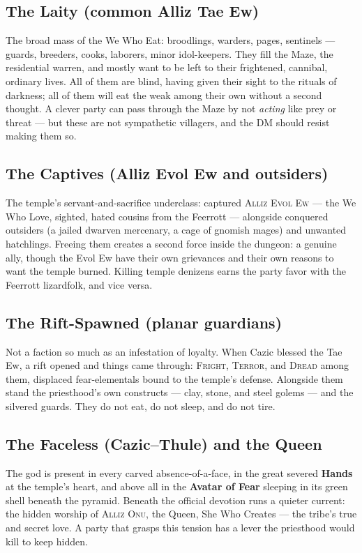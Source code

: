 \documentclass[10pt,twoside]{article}
\newcommand{\eqname}[1]{\textsc{#1}}
\begin{document}
\subsection*{The Laity (common Alliz Tae Ew)}
The broad mass of the We Who Eat: broodlings, warders, pages, sentinels --- guards,
breeders, cooks, laborers, minor idol-keepers. They fill the Maze, the residential
warren, and mostly want to be left to their frightened, cannibal, ordinary lives.
All of them are blind, having given their sight to the rituals of darkness; all of
them will eat the weak among their own without a second thought. A clever party can
pass through the Maze by not \emph{acting} like prey or threat --- but these are not
sympathetic villagers, and the DM should resist making them so.

\subsection*{The Captives (Alliz Evol Ew and outsiders)}
The temple's servant-and-sacrifice underclass: captured \eqname{Alliz Evol Ew} ---
the We Who Love, sighted, hated cousins from the Feerrott --- alongside conquered
outsiders (a jailed dwarven mercenary, a cage of gnomish mages) and unwanted
hatchlings. Freeing them creates a second force inside the dungeon: a genuine ally,
though the Evol Ew have their own grievances and their own reasons to want the
temple burned. Killing temple denizens earns the party favor with the Feerrott
lizardfolk, and vice versa.

\subsection*{The Rift-Spawned (planar guardians)}
Not a faction so much as an infestation of loyalty. When Cazic blessed the Tae Ew, a
rift opened and things came through: \eqname{Fright}, \eqname{Terror}, and
\eqname{Dread} among them, displaced fear-elementals bound to the temple's defense.
Alongside them stand the priesthood's own constructs --- clay, stone, and steel
golems --- and the silvered guards. They do not eat, do not sleep, and do not tire.

\subsection*{The Faceless (Cazic--Thule) and the Queen}
The god is present in every carved absence-of-a-face, in the great severed
\textbf{Hands} at the temple's heart, and above all in the \textbf{Avatar of Fear}
sleeping in its green shell beneath the pyramid. Beneath the official devotion runs a
quieter current: the hidden worship of \eqname{Alliz Onu}, the Queen, She Who
Creates --- the tribe's true and secret love. A party that grasps this tension has a
lever the priesthood would kill to keep hidden.
\end{document}

